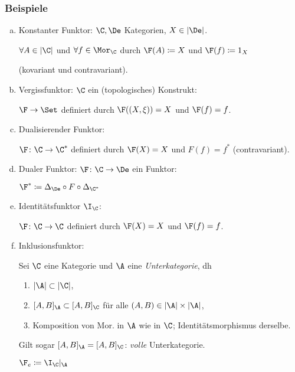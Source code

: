 \documentclass[serif,9pt]{beamer}
\begin{document}
\begin{frame}
  \frametitle{Beispiele}
  \begin{enumerate}[a)]
      \item<+-> Konstanter Funktor:
      $\C,\De$ Kategorien, $X \in |\De|$.

        $\forall A \in |\C|$ und $\forall f \in \Mor_\C$ durch $\F(A) \coloneqq X$ und $\F(f) \coloneqq 1_X$ 
        
        (kovariant und contravariant).
      \item<+-> Vergissfunktor: $\C$ ein (topologisches) Konstrukt: 
        
        $\F \to \Set$ definiert durch $\F((X, \xi)) = X$ und $\F(f) = f$.
      \item<+-> Dualisierender Funktor: 
        
        $\F \colon \C \to \C^*$ definiert durch $\F(X) = X$ und $F(f) = f^*$ (contravariant).
      \item<+-> Dualer Funktor: $\F \colon \C \to \De$ ein Funktor: 
        
        $\F^* \coloneqq \Delta_{\De} \circ F \circ \Delta_{\C^*}$
        
      \item<+-> Identitätsfunktor $\I_\C$: 
        
        $\F \colon \C \to \C$ definiert durch $\F(X) = X$ und $\F(f) = f$.

      \item<+-> Inklusionsfunktor: 
        
        Sei $\C$ eine Kategorie und $\A$ eine \emph{Unterkategorie}, dh 
        \begin{enumerate}[1.]
          \item $|\A| \subset |\C|$,
          \item $[A, B]_\A \subset [A,B]_\C$ für alle $(A, B) \in |\A| \times |\A|$,
          \item Komposition von Mor. in $\A$ wie in $\C$; Identitätsmorphismus derselbe.
        \end{enumerate}
        Gilt sogar $[A, B]_\A = [A, B]_\C$: \emph{volle} Unterkategorie.

        $\F_e \coloneqq \I_\C |_\A$
    \end{enumerate}
\end{frame}
\end{document}
